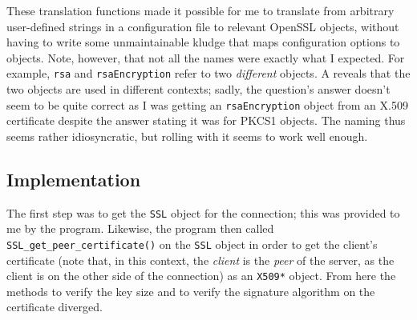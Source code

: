 \documentclass{article}
\begin{document}
These translation functions made it possible for me to translate from arbitrary user-defined strings in a configuration file to relevant OpenSSL objects, without having to write some unmaintainable kludge that maps configuration options to objects.  Note, however, that not all the names were exactly what I expected.  For example, \texttt{rsa} and \texttt{rsaEncryption} refer to two \emph{different} objects.  A  reveals that the two objects are used in different contexts; sadly, the question's answer doesn't seem to be quite correct as I was getting an \texttt{rsaEncryption} object from an X.509 certificate despite the answer stating it was for PKCS1 objects.  The naming thus seems rather idiosyncratic, but rolling with it seems to work well enough.

\subsection{Implementation}
The first step was to get the \texttt{SSL} object for the connection; this was provided to me by the program.  Likewise, the program then called \texttt{SSL_get_peer_certificate()} on the \texttt{SSL} object in order to get the client's certificate (note that, in this context, the \emph{client} is the \emph{peer} of the server, as the client is on the other side of the connection) as an \texttt{X509*} object.  From here the methods to verify the key size and to verify the signature algorithm on the certificate diverged.
\end{document}
